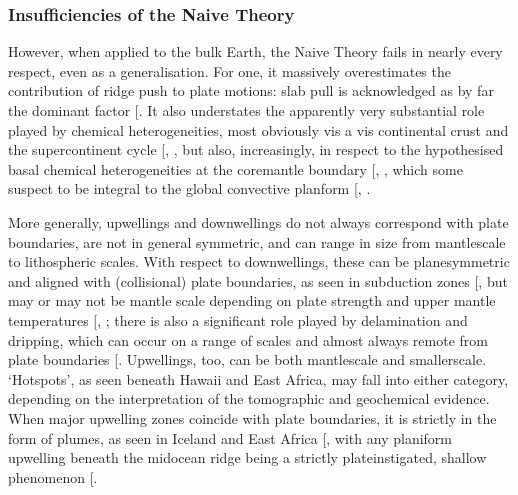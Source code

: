 \documentclass[letterpaper,10pt,english]{jupyterBook}
\begin{document}
\subsubsection{Insufficiencies of the Naive Theory}
\label{\detokenize{content/chapter_01_background/main:insufficiencies-of-the-naive-theory}}
\sphinxAtStartPar
However, when applied to the bulk Earth, the Naive Theory fails in nearly every respect, even as a generalisation. For one, it massively overestimates the contribution of ridge push to plate motions: slab pull is acknowledged as by far the dominant factor {[}\sphinxcite{references:id272}{]}. It also understates the apparently very substantial role played by chemical heterogeneities, most obviously vis a vis continental crust and the supercontinent cycle {[}, \sphinxcite{references:id629}{]}, but also, increasingly, in respect to the hypothesised basal chemical heterogeneities at the core\sphinxhyphen{}mantle boundary {[}, \sphinxcite{references:id438}{]}, which some suspect to be integral to the global convective planform {[}, \sphinxcite{references:id265}{]}.

\sphinxAtStartPar
More generally, upwellings and downwellings do not always correspond with plate boundaries, are not in general symmetric, and can range in size from mantle\sphinxhyphen{}scale to lithospheric scales. With respect to downwellings, these can be plane\sphinxhyphen{}symmetric and aligned with (collisional) plate boundaries, as seen in subduction zones {[}\sphinxcite{references:id266}{]}, but may or may not be mantle scale depending on plate strength and upper mantle temperatures {[}, \sphinxcite{references:id273}{]}; there is also a significant role played by delamination and dripping, which can occur on a range of scales and almost always remote from plate boundaries {[}\sphinxcite{references:id269}{]}. Upwellings, too, can be both mantle\sphinxhyphen{}scale and smaller\sphinxhyphen{}scale. ‘Hotspots’, as seen beneath Hawaii and East Africa, may fall into either category, depending on the interpretation of the tomographic and geochemical evidence. When major upwelling zones coincide with plate boundaries, it is strictly in the form of plumes, as seen in Iceland and East Africa {[}\sphinxcite{references:id271}{]}, with any planiform upwelling beneath the mid\sphinxhyphen{}ocean ridge being a strictly plate\sphinxhyphen{}instigated, shallow phenomenon {[}\sphinxcite{references:id268}{]}.
\end{document}
